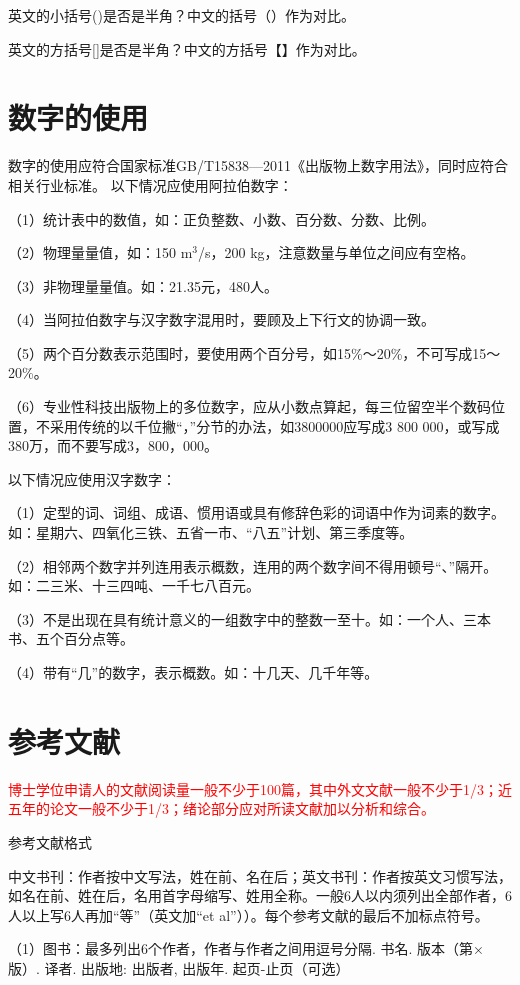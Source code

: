 英文的小括号()是否是半角？中文的括号（）作为对比。

英文的方括号[]是否是半角？中文的方括号【】作为对比。


\section{数字的使用}
数字的使用应符合国家标准GB/T15838—2011《出版物上数字用法》，同时应符合相关行业标准。
以下情况应使用阿拉伯数字：

（1）统计表中的数值，如：正负整数、小数、百分数、分数、比例。

（2）物理量量值，如：150 m$^3$/s，200 kg，注意数量与单位之间应有空格。

（3）非物理量量值。如：21.35元，480人。

（4）当阿拉伯数字与汉字数字混用时，要顾及上下行文的协调一致。

（5）两个百分数表示范围时，要使用两个百分号，如15\%～20\%，不可写成15～20\%。

（6）专业性科技出版物上的多位数字，应从小数点算起，每三位留空半个数码位置，不采用传统的以千位撇“，”分节的办法，如3800000应写成3 800 000，或写成380万，而不要写成3，800，000。

以下情况应使用汉字数字：

（1）定型的词、词组、成语、惯用语或具有修辞色彩的词语中作为词素的数字。如：星期六、四氧化三铁、五省一市、“八五”计划、第三季度等。

（2）相邻两个数字并列连用表示概数，连用的两个数字间不得用顿号“、”隔开。如：二三米、十三四吨、一千七八百元。

（3）不是出现在具有统计意义的一组数字中的整数一至十。如：一个人、三本书、五个百分点等。

（4）带有“几”的数字，表示概数。如：十几天、几千年等。

\section{参考文献}
\textcolor{red}{博士学位申请人的文献阅读量一般不少于100篇，其中外文文献一般不少于1/3；近五年的论文一般不少于1/3；绪论部分应对所读文献加以分析和综合。}

参考文献格式

中文书刊：作者按中文写法，姓在前、名在后；英文书刊：作者按英文习惯写法，如名在前、姓在后，名用首字母缩写、姓用全称。一般6人以内须列出全部作者，6人以上写6人再加“等”（英文加“et al”））。每个参考文献的最后不加标点符号。

（1）图书：最多列出6个作者，作者与作者之间用逗号分隔. 书名. 版本（第×版）. 译者. 出版地: 出版者, 出版年. 起页-止页（可选）

